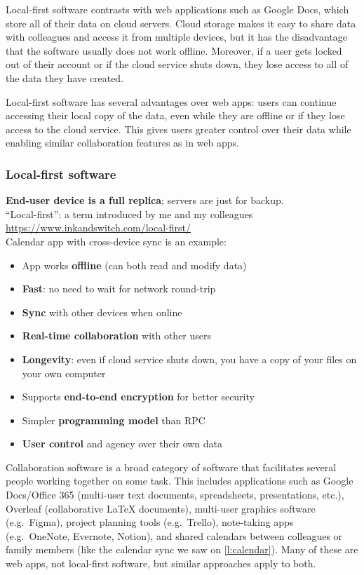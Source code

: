Local-first software contrasts with web applications such as Google Docs, which store all of their data on cloud servers.
Cloud storage makes it easy to share data with colleagues and access it from multiple devices, but it has the disadvantage that the software usually does not work offline.
Moreover, if a user gets locked out of their account or if the cloud service shuts down, they lose access to all of the data they have created.

Local-first software has several advantages over web apps: users can continue accessing their local copy of the data, even while they are offline or if they lose access to the cloud service.
This gives users greater control over their data while enabling similar collaboration features as in web apps.

\begin{frame}
    \label{s:local-first}
    \frametitle{Local-first software}
    \textbf{End-user device is a full replica}; servers are just for backup.\\
    ``Local-first'': a term introduced by me and my colleagues\\
    \url{https://www.inkandswitch.com/local-first/}\\[1em]
    Calendar app with cross-device sync is an example:\pause
    \begin{itemize}
        \item App works \textbf{offline} (can both read and modify data)
        \item \textbf{Fast}: no need to wait for network round-trip
        \item \textbf{Sync} with other devices when online
        \item \textbf{Real-time collaboration} with other users\pause
        \item \textbf{Longevity}: even if cloud service shuts down, you have a copy of your files on your own computer
        \item Supports \textbf{end-to-end encryption} for better security
        \item Simpler \textbf{programming model} than RPC
        \item \textbf{User control} and agency over their own data
    \end{itemize}
\end{frame}
\label{l:local-first}

Collaboration software is a broad category of software that facilitates several people working together on some task.
This includes applications such as Google Docs/Office 365 (multi-user text documents, spreadsheets, presentations, etc.), Overleaf (collaborative {\LaTeX} documents), multi-user graphics software (e.g.\ Figma), project planning tools (e.g.\ Trello), note-taking apps (e.g.\ OneNote, Evernote, Notion), and shared calendars between colleagues or family members (like the calendar sync we saw on \autoref{l:calendar}).
Many of these are web apps, not local-first software, but similar approaches apply to both.


